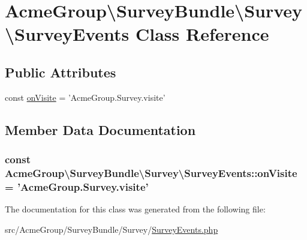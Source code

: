 \hypertarget{class_acme_group_1_1_survey_bundle_1_1_survey_1_1_survey_events}{\section{Acme\+Group\textbackslash{}Survey\+Bundle\textbackslash{}Survey\textbackslash{}Survey\+Events Class Reference}
\label{class_acme_group_1_1_survey_bundle_1_1_survey_1_1_survey_events}
}
\subsection*{Public Attributes}
\begin{DoxyCompactItemize}
\item 
const \hyperlink{class_acme_group_1_1_survey_bundle_1_1_survey_1_1_survey_events_aa1b03267a18e5db30f9b9208cf9f3b11}{on\+Visite} = 'Acme\+Group.\+Survey.\+visite'
\end{DoxyCompactItemize}


\subsection{Member Data Documentation}
\hypertarget{class_acme_group_1_1_survey_bundle_1_1_survey_1_1_survey_events_aa1b03267a18e5db30f9b9208cf9f3b11}{
\subsubsection[{on\+Visite}]{\setlength{\rightskip}{0pt plus 5cm}const Acme\+Group\textbackslash{}\+Survey\+Bundle\textbackslash{}\+Survey\textbackslash{}\+Survey\+Events\+::on\+Visite = 'Acme\+Group.\+Survey.\+visite'}}\label{class_acme_group_1_1_survey_bundle_1_1_survey_1_1_survey_events_aa1b03267a18e5db30f9b9208cf9f3b11}


The documentation for this class was generated from the following file\+:\begin{DoxyCompactItemize}
\item 
src/\+Acme\+Group/\+Survey\+Bundle/\+Survey/\hyperlink{_survey_events_8php}{Survey\+Events.\+php}\end{DoxyCompactItemize}
